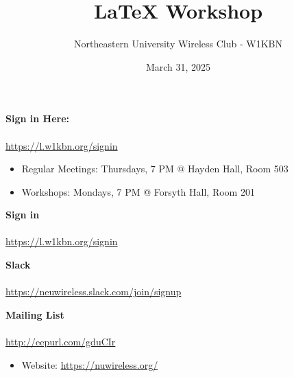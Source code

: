 \documentclass[x11names]{beamer} %
\title{LaTeX Workshop}
\author{Northeastern University Wireless Club - W1KBN}
\date{March 31, 2025}
\begin{document}
\begin{frame}
  \titlepage
  \vspace{-1cm}
  \begin{center}
    \textbf{Sign in Here:} \\
     \\
    {\small \url{https://l.w1kbn.org/signin}}
  \end{center}
\end{frame}

\begin{frame}
  \begin{tcolorbox}[colframe=black, colback=blue!10, title=About, center title]
    \begin{itemize}
      \item Regular Meetings: Thursdays, 7 PM @ Hayden Hall, Room 503
      \item Workshops: Mondays, 7 PM @ Forsyth Hall, Room 201
    \end{itemize}        
  \end{tcolorbox}

  \begin{tcolorbox}[colframe=black, colback=blue!10, title=QR Codes \& Links, center title]
    \begin{minipage}{0.32\textwidth}
      \centering
      \textbf{Sign in} \\
       \\
      \tiny \url{https://l.w1kbn.org/signin}
    \end{minipage}
    \begin{minipage}{0.32\textwidth}
      \centering
      \textbf{Slack} \\
       \\
      \tiny \url{https://neuwireless.slack.com/join/signup}
    \end{minipage}
    \begin{minipage}{0.32\textwidth}
      \centering
      \textbf{Mailing List} \\
       \\
      \tiny \url{http://eepurl.com/gduCIr}
    \end{minipage}
    \begin{itemize}
      \item Website: \url{https://nuwireless.org/}
    \end{itemize}
  \end{tcolorbox}
\end{frame}
\end{document}
